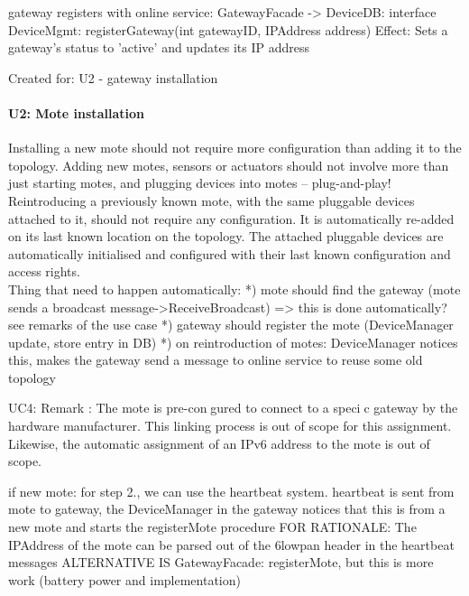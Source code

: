         gateway registers with online service:
            GatewayFacade -> DeviceDB: interface DeviceMgmt: registerGateway(int gatewayID, IPAddress address)
                Effect: Sets a gateway's status to 'active' and updates its IP address
                \item Created for: U2 - gateway installation


    \paragraph{U2: Mote installation}
        Installing a new mote should not require more configuration than adding it
        to the topology. Adding new motes, sensors or actuators should not involve
        more than just starting motes, and plugging devices into motes – plug-and-play!
        Reintroducing a previously known mote, with the same pluggable devices attached to it,
        should not require any configuration. It is automatically re-added on
        its last known location on the topology. The attached pluggable devices
        are automatically initialised and configured with their last known
        configuration and access rights. \\
        Thing that need to happen automatically:
        *) mote should find the gateway (mote sends a broadcast message->ReceiveBroadcast) => this is done automatically? see remarks of the use case
        *) gateway should register the mote (DeviceManager update, store entry in DB)
        *) on reintroduction of motes: DeviceManager notices this, makes the gateway send a message to online service to reuse some old topology

        UC4:
            Remark : The mote is pre-congured to connect to a specic gateway by
             the hardware manufacturer. This linking process is out of scope for
             this assignment. Likewise, the automatic assignment of an IPv6 address
             to the mote is out of scope.

            if new mote:
                for step 2., we can use the heartbeat system. heartbeat is sent from mote to gateway,
                the DeviceManager in the gateway notices that this is from a new mote and starts
                the registerMote procedure
                FOR RATIONALE: The IPAddress of the mote can be parsed out of the 6lowpan header in the heartbeat messages
                ALTERNATIVE IS GatewayFacade: registerMote, but this is more work (battery power and implementation)

